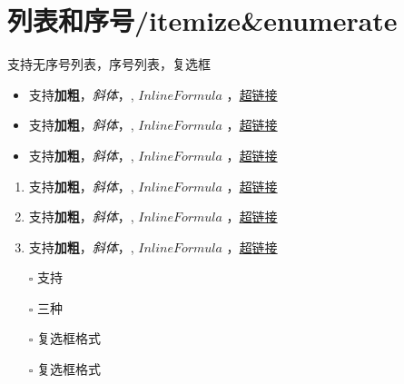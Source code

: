 \documentclass{article}%
\begin{document}
%
%
%

%
\section{列表和序号/itemize\&enumerate}%

%

%
支持无序号列表，序号列表，复选框%

%

%
\begin{itemize}%
\item%
支持\textbf{加粗}，\textit{斜体}，, $Inline Formula$ ，\href{http:///www.github.com/sailist/MarkTex2}{超链接}%
\item%
支持\textbf{加粗}，\textit{斜体}，, $Inline Formula$ ，\href{http:///www.github.com/sailist/MarkTex2}{超链接}%
\item%
支持\textbf{加粗}，\textit{斜体}，, $Inline Formula$ ，\href{http:///www.github.com/sailist/MarkTex2}{超链接}%
\end{itemize}%

%
%

%

%
\begin{enumerate}%
\item%
支持\textbf{加粗}，\textit{斜体}，, $Inline Formula$ ，\href{http:///www.github.com/sailist/MarkTex2}{超链接}%
\item%
支持\textbf{加粗}，\textit{斜体}，, $Inline Formula$ ，\href{http:///www.github.com/sailist/MarkTex2}{超链接}%
\item%
支持\textbf{加粗}，\textit{斜体}，, $Inline Formula$ ，\href{http:///www.github.com/sailist/MarkTex2}{超链接}%
\end{enumerate}%

%
%

%

%
\begin{itemize}%
\item[\rlap{\raisebox{0.3ex}{\hspace{0.4ex}\scriptsize \ding{56}}}$\square$]%
支持%
\item[$\square$]%
三种%
\item[\rlap{\raisebox{0.3ex}{\hspace{0.4ex}\tiny \ding{52}}}$\square$]%
复选框格式%
\item[$\square$]%
复选框格式%
\end{itemize}%
\end{document}
